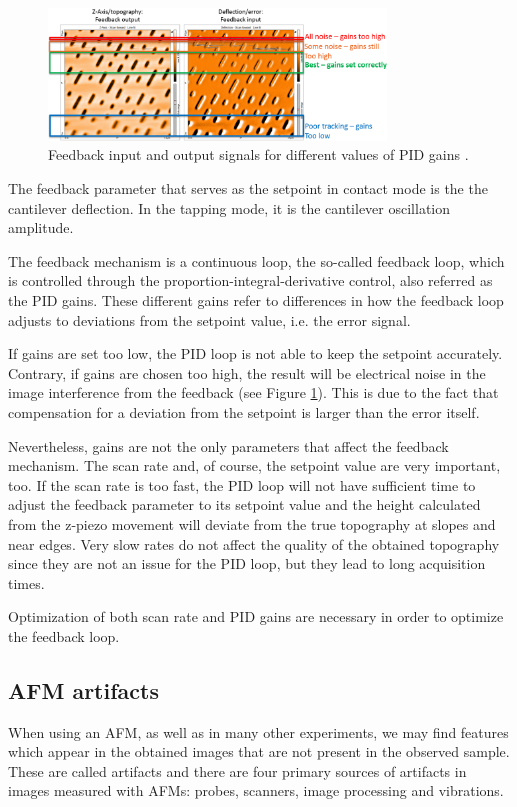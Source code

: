 \documentclass[11pt,a4paper]{article}
\begin{document}
\begin{figure}[hbt]
\centering
\includegraphics[width=0.8\textwidth]{afm-modes-feedback}
\caption{Feedback input and output signals for different values of PID gains \cite{nanosurf}.}
\label{fig:feedback}
\end{figure}

The feedback parameter that serves as the setpoint in contact mode is the the cantilever deflection. In the tapping mode, it is the cantilever oscillation amplitude.

The feedback mechanism is a continuous loop, the so-called feedback loop, which is controlled through the proportion-integral-derivative control, also referred as the PID gains. These different gains refer to differences in how the feedback loop adjusts to deviations from the setpoint value, i.e. the error signal. 

If gains are set too low, the PID loop is not able to keep the setpoint accurately. Contrary, if gains are chosen too high, the result will be electrical noise in the image interference from the feedback (see Figure \ref{fig:feedback}). This is due to the fact that compensation for a deviation from the setpoint is larger than the error itself.

Nevertheless, gains are not the only parameters that affect the feedback mechanism. The scan rate and, of course, the setpoint value are very important, too. If the scan rate is too fast, the PID loop will not have sufficient time to adjust the feedback parameter to its setpoint value and the height calculated from the z-piezo movement will deviate from the true topography at slopes and near edges. Very slow rates do not affect the quality of the obtained topography since they are not an issue for the PID loop, but they lead to long acquisition times.

Optimization of both scan rate and PID gains are necessary in order to optimize the feedback loop.

\subsection{AFM artifacts}
When using an AFM, as well as in many other experiments, we may find features which appear in the obtained images that are not present in the observed sample. These are called artifacts \cite{artifacts} and there are four primary sources of artifacts in images measured with AFMs: probes, scanners, image processing and vibrations.
\end{document}
